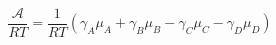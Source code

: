 \begin{equation}\label{eqn:reaction-affinity}
\frac{\mathcal{A}}{RT}=\frac{1}{RT}\left({{\gamma }_{A}}{{\mu }_{A}}+{{\gamma }_{B}}{{\mu }_{B}}-{{\gamma }_{C}}{{\mu }_{C}}-{{\gamma }_{D}}{{\mu }_{D}}\right)
\end{equation}